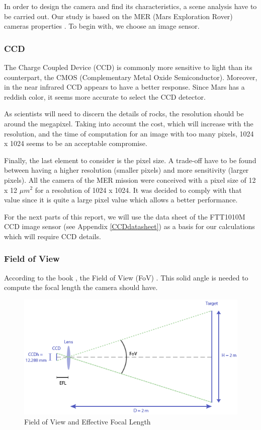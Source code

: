 In order to design the camera and find its characteristics, a scene analysis have to be carried out. Our study is based on the MER (Mars Exploration Rover) cameras properties \cite{merengineeringcameras}.
To begin with, we choose an image sensor. 

\subsubsection{CCD}
\label{fig:CCD}
The Charge Coupled Device (CCD) is commonly more sensitive to light than its counterpart, the CMOS (Complementary Metal Oxide Semiconductor). Moreover, in the near infrared CCD appears to have a better response. Since Mars has a reddish color, it seems more accurate to select the CCD detector.

As scientists will need to discern the details of rocks, the resolution should be around the megapixel. Taking into account the cost, which will increase with the resolution, and the time of computation for an image with too many pixels, 1024 x 1024 seems to be an acceptable compromise.

Finally, the last element to consider is the pixel size. A trade-off have to be found between having a higher resolution (smaller pixels) and more sensitivity (larger pixels). All the camera of the MER mission were conceived with a pixel size of 12 x 12 $\mu m^2$ for a resolution of 1024 x 1024. It was decided to comply with that value since it is quite a large pixel value which allows a better performance.

For the next parts of this report, we will use the data sheet of the FTT1010M CCD image sensor (see Appendix \ref{CCDdatasheet}) as a basis for our calculations which will require CCD details.

\subsubsection{Field of View}
According to the book \cite{book}, the Field of View (FoV) . This solid angle is needed to compute the focal length the camera should have.

\begin{figure}[h]
  \centering
  \includegraphics[scale=0.7]{fig/FOV.png}
  \caption{Field of View and Effective Focal Length}
  \label{fig:FOV}
\end{figure}

